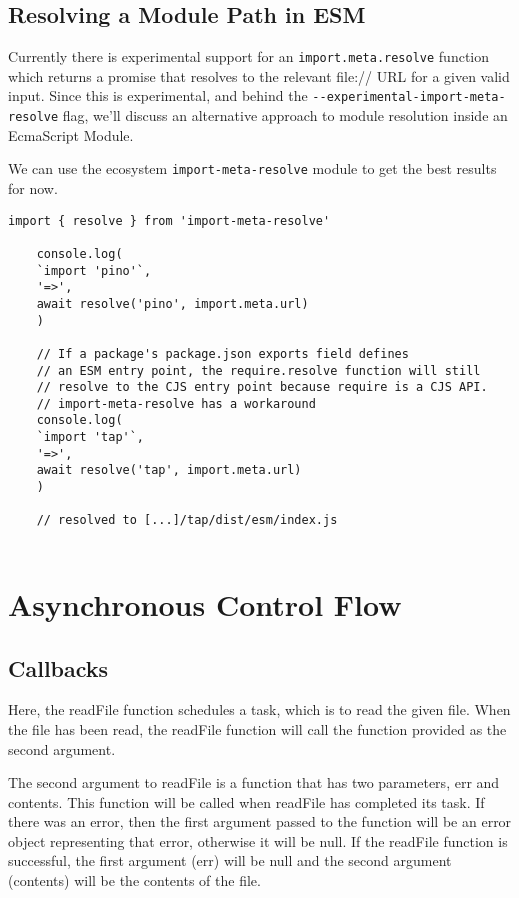 \documentclass{scrartcl}
\begin{document}
\subsection{Resolving a Module Path in ESM}

Currently there is experimental support for an \lstinline|import.meta.resolve| function which returns a promise that resolves to the relevant file:// URL for a given valid input. Since this is experimental, and behind the \lstinline|--experimental-import-meta-resolve| flag, we'll discuss an alternative approach to module resolution inside an EcmaScript Module.

We can use the ecosystem \lstinline|import-meta-resolve| module to get the best results for now.

\begin{lstlisting}[style=ES6]
    import { resolve } from 'import-meta-resolve'

    console.log(
    `import 'pino'`,
    '=>',
    await resolve('pino', import.meta.url)
    )

    // If a package's package.json exports field defines
    // an ESM entry point, the require.resolve function will still
    // resolve to the CJS entry point because require is a CJS API.
    // import-meta-resolve has a workaround
    console.log(
    `import 'tap'`,
    '=>',
    await resolve('tap', import.meta.url)
    )

    // resolved to [...]/tap/dist/esm/index.js


\end{lstlisting}

\section{ Asynchronous Control Flow }

\subsection{Callbacks}

Here, the readFile function schedules a task, which is to read the given file. When the file has been read, the readFile function will call the function provided as the second argument.

The second argument to readFile is a function that has two parameters, err and contents. This function will be called when readFile has completed its task. If there was an error, then the first argument passed to the function will be an error object representing that error, otherwise it will be null. If the readFile function is successful, the first argument (err) will be null and the second argument (contents) will be the contents of the file.
\end{document}

